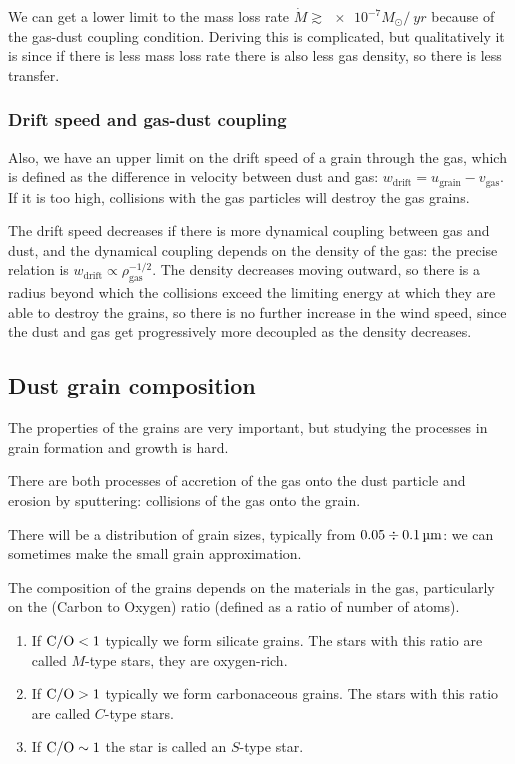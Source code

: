 \documentclass[main.tex]{subfiles}
\begin{document}
We can get a lower limit to the mass loss rate \(\dot{M} \gtrsim \num{e-7} M_{\odot} / \SI{}{yr}\) because of the gas-dust coupling condition.
Deriving this is complicated, but qualitatively it is since if there is less mass loss rate there is also less gas density, so there is less transfer. 

\subsubsection{Drift speed and gas-dust coupling}

Also, we have an upper limit on the drift speed of a grain through the gas, which is defined as the difference in velocity between dust and gas: \(w _{\text{drift}}= u_{\text{grain}} - v _{\text{gas}} \). If it is too high, collisions with the gas particles will destroy the gas grains. 

The drift speed decreases if there is more dynamical coupling between gas and dust, and the dynamical coupling depends on the density of the gas: the precise relation is
\(w _{\text{drift}} \propto \rho _{\text{gas}}^{-1/2}\). 
The density decreases moving outward, so there is a radius beyond which the collisions exceed the limiting energy at which they are able to destroy the grains, so there is no further increase in the wind speed, since the dust and gas get progressively more decoupled as the density decreases. 

\subsection{Dust grain composition}

The properties of the grains are very important, but studying the processes in grain formation and growth is hard. 

There are both processes of accretion of the gas onto the dust particle and erosion by sputtering: collisions of the gas onto the grain. 

There will be a distribution of grain sizes, typically from \(\num{.05} \divisionsymbol \SI{.1}{\micro\metre}\): we can sometimes make the small grain approximation. 

The composition of the grains depends on the materials in the gas, particularly on the  (Carbon to Oxygen) ratio (defined as a ratio of number of atoms).

\begin{enumerate}
  \item If \(\ce{C/O} <1\) typically we form silicate grains. The stars with this ratio are called \(M\)-type stars, they are oxygen-rich.
  \item If \(\ce{C/O} >1\) typically we form carbonaceous grains. The stars with this ratio are called \(C\)-type stars. 
  \item If \(\ce{C/O} \sim 1\) the star is called an \(S\)-type star.
\end{enumerate}
\end{document}

